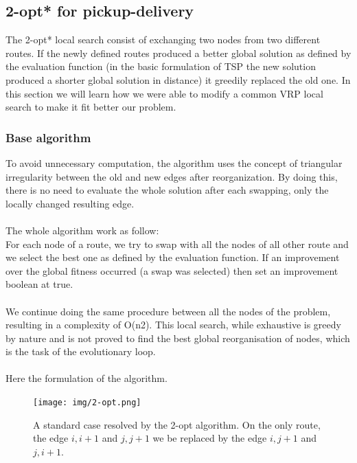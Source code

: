 \documentclass[12pt]{memoir}
\begin{document}
\subsection{2-opt* for pickup-delivery}
The 2-opt* local search consist of exchanging two nodes from two different routes. If the newly defined routes
produced a better global solution as defined by the evaluation function (in the basic formulation of TSP
the new solution produced a shorter global solution in distance) it greedily replaced the old
one. In this section we will learn how we were able to modify a common VRP local
search to make it fit better our problem.


\subsubsection{Base algorithm}
To avoid unnecessary computation, the algorithm uses the concept of triangular
irregularity\cite{li2003local}
between the old and new edges after reorganization. By doing this, there is no need to
evaluate the whole solution after each swapping, only the locally changed resulting edge.\\
\\
The whole algorithm work as follow:\\
For each node of a route, we try to swap with all the nodes of all other route and we
select the best one as defined by the evaluation function. If an improvement over the global
fitness occurred (a swap was selected) then set an improvement boolean at true.\\
\\
We continue doing the same procedure between all the nodes of the problem, resulting in a
complexity of O(n2). This local search, while exhaustive is greedy by nature and is not proved
to find the best global reorganisation of nodes, which is the task of the evolutionary loop.\\
\\
Here the formulation of the algorithm.
\begin{figure}[htbp]
	\begin{center}
		\texttt{[image: img/2-opt.png]}
		\caption{A standard case resolved by the 2-opt algorithm. On the only route, the edge $i,i+1$  and
    $j,j+1$ we be replaced by the edge $i,j+1$ and $j,i+1$.}
	\end{center}
\end{figure}
\end{document}

